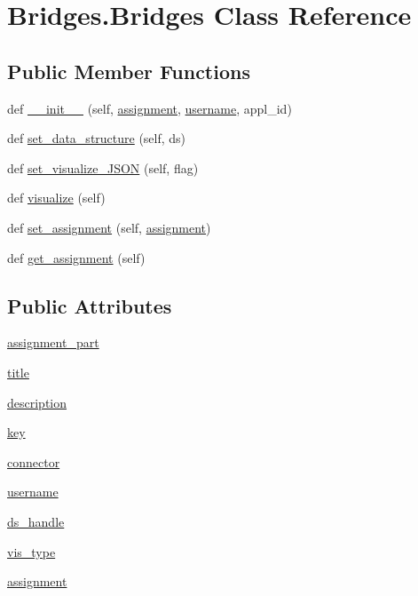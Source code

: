 \hypertarget{class_bridges_1_1_bridges}{}\section{Bridges.\+Bridges Class Reference}
\label{class_bridges_1_1_bridges}
\subsection*{Public Member Functions}
\begin{DoxyCompactItemize}
\item 
def \hyperlink{class_bridges_1_1_bridges_a1d8b1843440ff7750a8bcce34ff38d58}{\+\_\+\+\_\+init\+\_\+\+\_\+} (self, \hyperlink{class_bridges_1_1_bridges_ab51a162b834a8c908ab1702716feb435}{assignment}, \hyperlink{class_bridges_1_1_bridges_aac3c71b6c4965da2a189e1be805a6c95}{username}, appl\+\_\+id)
\item 
def \hyperlink{class_bridges_1_1_bridges_a8eedc1251d59aa6024d5516764ece104}{set\+\_\+data\+\_\+structure} (self, ds)
\item 
def \hyperlink{class_bridges_1_1_bridges_ac580a09eb76e650b3324994bdc337001}{set\+\_\+visualize\+\_\+\+J\+S\+O\+N} (self, flag)
\item 
def \hyperlink{class_bridges_1_1_bridges_a959d85af2922264b0b40dea84db285b2}{visualize} (self)
\item 
def \hyperlink{class_bridges_1_1_bridges_a4caec394d0b5d99089d8e7d33459b1a5}{set\+\_\+assignment} (self, \hyperlink{class_bridges_1_1_bridges_ab51a162b834a8c908ab1702716feb435}{assignment})
\item 
def \hyperlink{class_bridges_1_1_bridges_aa5b4ae783dba3b9d41be9cc4fe240a8c}{get\+\_\+assignment} (self)
\end{DoxyCompactItemize}
\subsection*{Public Attributes}
\begin{DoxyCompactItemize}
\item 
\hyperlink{class_bridges_1_1_bridges_a17cca09421d95475391eb7c4c44f2760}{assignment\+\_\+part}
\item 
\hyperlink{class_bridges_1_1_bridges_ac03733425ee0275a212b2383eaab6359}{title}
\item 
\hyperlink{class_bridges_1_1_bridges_a45bab6e16e95c52882ed4ad2b65fbd33}{description}
\item 
\hyperlink{class_bridges_1_1_bridges_a4cb1e2a2f5948c82a0d0e3124b343c84}{key}
\item 
\hyperlink{class_bridges_1_1_bridges_acb35956382504696d50987a3170d7ce1}{connector}
\item 
\hyperlink{class_bridges_1_1_bridges_a8d2831f97f5b0423475c2f923778c2bf}{username}
\item 
\hyperlink{class_bridges_1_1_bridges_a3ed982321a3ac2690ee6222d679e9c9d}{ds\+\_\+handle}
\item 
\hyperlink{class_bridges_1_1_bridges_ad5c38f63f0d78fcc5b030fe37f13d3fc}{vis\+\_\+type}
\item 
\hyperlink{class_bridges_1_1_bridges_aa1e8987b949f6d6784672c718d0ccf7b}{assignment}
\end{DoxyCompactItemize}

